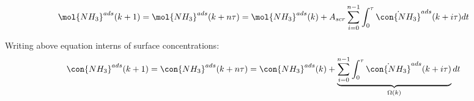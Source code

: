 \begin{align}
    \mol{NH_3}^{ads}(k + 1) = \mol{NH_3}^{ads} (k + n\tau) &= \mol{NH_3}^{ads} (k) + A_{scr} \sum_{i=0}^{n-1} \int_{0}^{\tau} \dot{\con{NH_3}}^{ads} (k + i\tau) dt
\end{align}

Writing above equation interns of surface concentrations:
\begin{align}
    \con{NH_3}^{ads}(k + 1) = \con{NH_3}^{ads} (k + n\tau) &= \con{NH_3}^{ads} (k) + \underbrace{\sum_{i=0}^{n-1} \int_{0}^{\tau} \dot{\con{NH_3}}^{ads} (k + i\tau)}_{\Omega(k)}   dt
\end{align}
